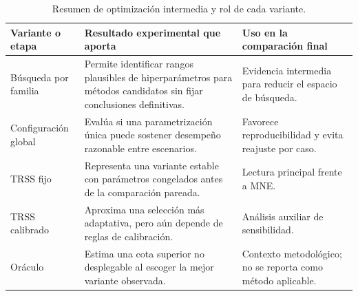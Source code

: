 \begin{table}[htbp]
\centering
\small
\caption{Resumen de optimización intermedia y rol de cada variante.}
\label{tab:ch4_intermediate_optimization_summary}
\begin{tabular}{@{}p{2.9cm}p{4.7cm}p{4.0cm}@{}}
\toprule
Variante o etapa & Resultado experimental que aporta & Uso en la comparación final \\
\midrule
Búsqueda por familia & Permite identificar rangos plausibles de hiperparámetros para métodos candidatos sin fijar conclusiones definitivas. & Evidencia intermedia para reducir el espacio de búsqueda. \\
Configuración global & Evalúa si una parametrización única puede sostener desempeño razonable entre escenarios. & Favorece reproducibilidad y evita reajuste por caso. \\
TRSS fijo & Representa una variante estable con parámetros congelados antes de la comparación pareada. & Lectura principal frente a MNE. \\
TRSS calibrado & Aproxima una selección más adaptativa, pero aún depende de reglas de calibración. & Análisis auxiliar de sensibilidad. \\
Oráculo & Estima una cota superior no desplegable al escoger la mejor variante observada. & Contexto metodológico; no se reporta como método aplicable. \\
\bottomrule
\end{tabular}
\end{table}
